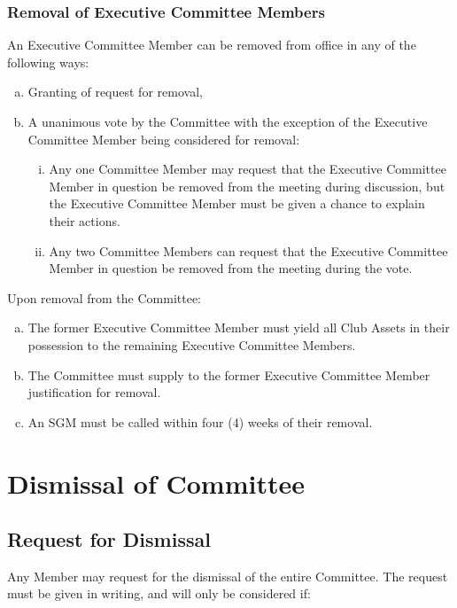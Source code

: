 \documentclass[a4paper,12pt]{article}
\begin{document}
\subsubsection{Removal of Executive Committee Members}

An Executive Committee Member can be removed from office in any of the following ways:

\begin{enumerate}[a)]
	\item Granting of request for removal,
	\item A unanimous vote by the Committee with the exception of the Executive Committee Member being considered for removal:
	\begin{enumerate}[i)]
		\item Any one Committee Member may request that the Executive Committee Member in question be removed from the meeting during discussion, but the Executive Committee Member must be given a chance to explain their actions.
		\item Any two Committee Members can request that the Executive Committee Member in question be removed from the meeting during the vote.
	\end{enumerate}
\end{enumerate}

Upon removal from the Committee:

\begin{enumerate}[a)]
	\item The former Executive Committee Member must yield all Club Assets in their possession to the remaining Executive Committee Members.
	\item The Committee must supply to the former Executive Committee Member justification for removal.
	\item An SGM must be called within four (4) weeks of their removal.
\end{enumerate}

\section{Dismissal of Committee}

\subsection{Request for Dismissal}

Any Member may request for the dismissal of the entire Committee. The request must be given in writing, and will only be considered if:
\end{document}
